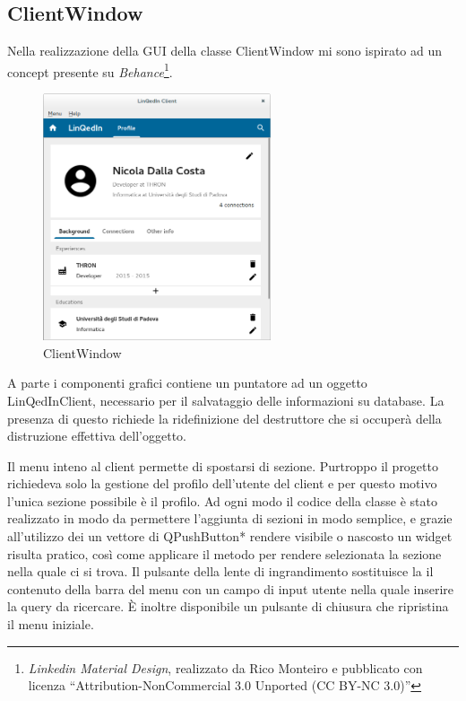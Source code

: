 \documentclass[a4paper]{article}
\begin{document}
\subsection*{ClientWindow}
Nella realizzazione della GUI della classe ClientWindow mi sono ispirato ad un concept presente su \textit{Behance}\footnote{\textit{Linkedin Material Design}, realizzato da Rico Monteiro e pubblicato con licenza ``Attribution-NonCommercial 3.0 Unported (CC BY-NC 3.0)''}.

\begin{figure}[!ht]
\centering
\includegraphics[width=0.6\textwidth]{ClientWindow.png}
\caption{ClientWindow}
\end{figure}

A parte i componenti grafici contiene un puntatore ad un oggetto LinQedInClient, necessario per il salvataggio delle informazioni su database. La presenza di questo richiede la ridefinizione del destruttore che si occuperà della distruzione effettiva dell'oggetto.

Il menu inteno al client permette di spostarsi di sezione. Purtroppo il progetto richiedeva solo la gestione del profilo dell'utente del client e per questo motivo l'unica sezione possibile è il profilo. Ad ogni modo il codice della classe è stato realizzato in modo da permettere l'aggiunta di sezioni in modo semplice, e grazie all'utilizzo dei un vettore di QPushButton* rendere visibile o nascosto un widget risulta pratico, così come applicare il metodo per rendere selezionata la sezione nella quale ci si trova. Il pulsante della lente di ingrandimento sostituisce la il contenuto della barra del menu con un campo di input utente nella quale inserire la query da ricercare. È inoltre disponibile un pulsante di chiusura che ripristina il menu iniziale.
\end{document}
